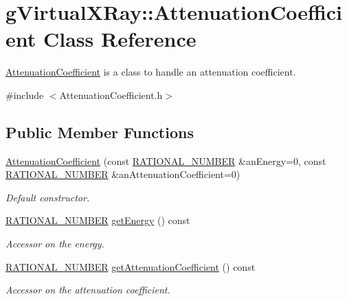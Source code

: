 \hypertarget{classg_virtual_x_ray_1_1_attenuation_coefficient}{
\section{gVirtualXRay::AttenuationCoefficient Class Reference}
\label{classg_virtual_x_ray_1_1_attenuation_coefficient}
}


\hyperlink{classg_virtual_x_ray_1_1_attenuation_coefficient}{AttenuationCoefficient} is a class to handle an attenuation coefficient.  




{\ttfamily \#include $<$AttenuationCoefficient.h$>$}

\subsection*{Public Member Functions}
\begin{DoxyCompactItemize}
\item 
\hyperlink{classg_virtual_x_ray_1_1_attenuation_coefficient_ad34cf04962b899ae41b585ce950f070c}{AttenuationCoefficient} (const \hyperlink{namespace_utilities_a40969b96bd8d847b962e297cb79f08ce}{RATIONAL\_\-NUMBER} \&anEnergy=0, const \hyperlink{namespace_utilities_a40969b96bd8d847b962e297cb79f08ce}{RATIONAL\_\-NUMBER} \&anAttenuationCoefficient=0)
\begin{DoxyCompactList}\small\item\em Default constructor. \end{DoxyCompactList}\item 
\hyperlink{namespace_utilities_a40969b96bd8d847b962e297cb79f08ce}{RATIONAL\_\-NUMBER} \hyperlink{classg_virtual_x_ray_1_1_attenuation_coefficient_a253c12bdb5cdea1101780a5b2af6c84f}{getEnergy} () const 
\begin{DoxyCompactList}\small\item\em Accessor on the energy. \end{DoxyCompactList}\item 
\hyperlink{namespace_utilities_a40969b96bd8d847b962e297cb79f08ce}{RATIONAL\_\-NUMBER} \hyperlink{classg_virtual_x_ray_1_1_attenuation_coefficient_a9377adabdd0f4ce42ff4c60377bf3517}{getAttenuationCoefficient} () const 
\begin{DoxyCompactList}\small\item\em Accessor on the attenuation coefficient. \end{DoxyCompactList}\end{DoxyCompactItemize}
